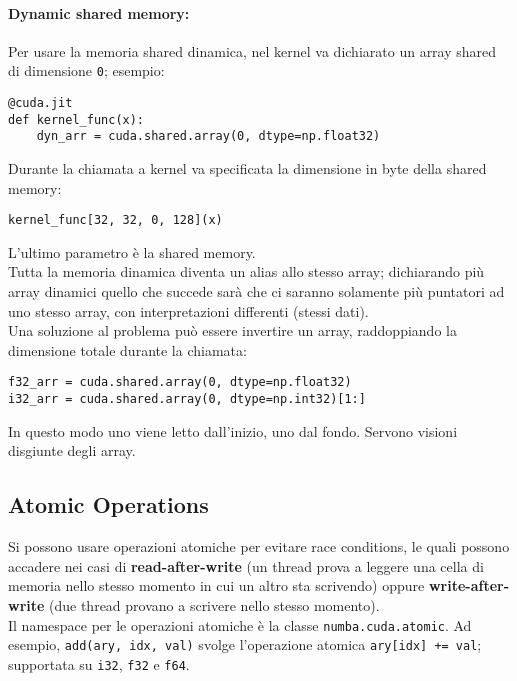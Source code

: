 \paragraph{Dynamic shared memory:} Per usare la memoria shared dinamica, nel kernel va dichiarato un array shared di dimensione \texttt{0}; esempio:
\begin{verbatim}
@cuda.jit
def kernel_func(x):
	dyn_arr = cuda.shared.array(0, dtype=np.float32)
\end{verbatim}

Durante la chiamata a kernel va specificata la dimensione in byte della shared memory:
\begin{verbatim}
kernel_func[32, 32, 0, 128](x)
\end{verbatim}
L'ultimo parametro è la shared memory.\\

Tutta la memoria dinamica diventa un alias allo stesso array; dichiarando più array dinamici quello che succede sarà che ci saranno solamente più puntatori ad uno stesso array, con interpretazioni differenti (stessi dati).\\

Una soluzione al problema può essere invertire un array, raddoppiando la dimensione totale durante la chiamata:
\begin{verbatim}
f32_arr = cuda.shared.array(0, dtype=np.float32)
i32_arr = cuda.shared.array(0, dtype=np.int32)[1:]
\end{verbatim}
In questo modo uno viene letto dall'inizio, uno dal fondo. Servono visioni disgiunte degli array.\\

\subsection{Atomic Operations}

Si possono usare operazioni atomiche per evitare race conditions, le quali possono accadere nei casi di \textbf{read-after-write} (un thread prova a leggere una cella di memoria nello stesso momento in cui un altro sta scrivendo) oppure \textbf{write-after-write} (due thread provano a scrivere nello stesso momento).\\

Il namespace per le operazioni atomiche è la classe \texttt{numba.cuda.atomic}. Ad esempio, \texttt{add(ary, idx, val)} svolge l'operazione atomica \texttt{ary[idx] += val}; supportata su \texttt{i32}, \texttt{f32} e \texttt{f64}.\\

